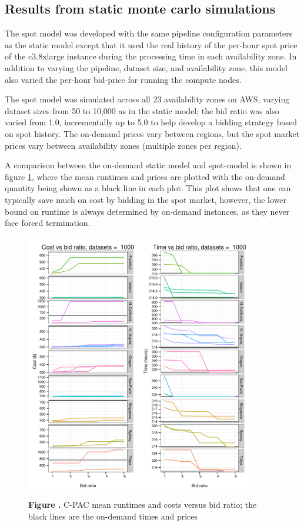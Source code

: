 \documentclass{frontiersSCNS} %
\begin{document}
\subsection{Results from static monte carlo simulations}

The spot model was developed with the same pipeline configuration parameters as the static model except that it used the real history of the per-hour spot price of the c3.8xlarge instance during the processing time in each availability zone. In addition to varying the pipeline, dataset size, and availability zone, this model also varied the per-hour bid-price for running the compute nodes.

The spot model was simulated across all 23 availability zones on AWS, varying dataset sizes from 50 to 10,000 as in the static model; the bid ratio was also varied from 1.0, incrementally up to 5.0 to help develop a bidding strategy based on spot history. The on-demand prices vary between regions, but the spot market prices vary between availability zones (multiple zones per region).

A comparison between the on-demand static model and spot-model is shown in figure \ref{fig:02}, where the mean runtimes and prices are plotted with the on-demand quantity being shown as a black line in each plot. This plot shows that one can typically save much on cost by bidding in the spot market, however, the lower bound on runtime is always determined by on-demand instances, as they never face forced termination.

\begin{figure}[!ht]
\begin{center}
\includegraphics[width=10cm]{../../spot-model/plots/cpac_sim_mean.pdf}%
\end{center}
 \textbf{\label{fig:02} Figure .}{ C-PAC mean runtimes and costs versus bid ratio; the black lines are the on-demand times and prices }
\end{figure}
\end{document}
